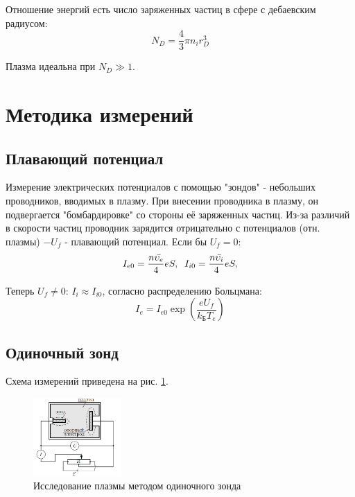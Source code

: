 \documentclass[a4paper,12pt]{article} %
\begin{document}
Отношение энергий есть число заряженных частиц в сфере с дебаевским радиусом:
\begin{equation}
\label{N_D}
N_D = \frac{4}{3}\pi n_ir^3_D
\end{equation}

Плазма идеальна при $N_D\gg1$.

\section{Методика измерений}
\subsection{Плавающий потенциал}
Измерение электрических потенциалов с помощью "зондов" - небольших проводников, вводимых в плазму. При внесении проводника в плазму, он подвергается "бомбардировке" со стороны её заряженных частиц. Из-за различий в скорости частиц проводник зарядится отрицательно с потенциалов (отн. плазмы) $-U_f$ - плавающий потенциал.
Если бы $U_f = 0$:
\begin{equation}\label{i_0}
I_{e0} = \frac{n\bar{\upsilon_e}}{4}eS, \hspace{2mm} I_{i0} = \frac{n\bar{\upsilon_i}}{4}eS, 
\end{equation}

Теперь $U_f \neq 0$: $I_i \approx I_{i0}$, согласно распределению Больцмана:
\begin{equation}
I_e = I_{e0} \exp(\frac{eU_f}{k_БT_e})
\end{equation}

\subsection{Одиночный зонд}
Схема измерений приведена на рис. \ref{одиночный}. 
\begin{figure}[h!]
\includegraphics[width=0.3\textwidth]{Одиночный}
\caption{Исследование плазмы методом одиночного зонда} \label{одиночный}
\end{figure}
\end{document}
